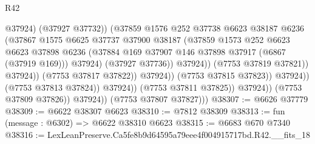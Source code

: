 \begin{lexlean}{R42}
\begin{coremodule}
{                                                  @37924)
                                                (@37927 @37732))
                                              (@37859
                                                @1576
                                                @252
                                                @37738
                                                @6623
                                                @38187
                                                @6236
                                                (@37867
                                                  @1575
                                                  @6625
                                                  @37737
                                                  @37900
                                                  @38187
                                                  (@37859
                                                    @1573
                                                    @252
                                                    @6623
                                                    @6623
                                                    @37898
                                                    @6236
                                                    (@37884
                                                      @169
                                                      @37907
                                                      @146
                                                      @37898
                                                      @37917
                                                      (@6867 (@37919 @169)))
                                                    @37924)
                                                  (@37927 @37736))
                                                @37924))
                                            (@7753 @37819 @37821))
                                          @37924))
                                      (@7753 @37817 @37822))
                                    @37924))
                                (@7753 @37815 @37823))
                              @37924))
                          (@7753 @37813 @37824))
                        @37924))
                    (@7753 @37811 @37825))
                  @37924))
              (@7753 @37809 @37826))
            @37924))
        (@7753 @37807 @37827)))
@38307 := @6626 @37779
@38309 := @6622 @38307 @6623
@38310 := @7812 @38309
@38313 := fun (message : @6302) => @6622 @38310 @6623
@38315 := @6683 @670 @7340
@38316 := LexLeanPreserve.Ca5fe8b9d64595a79eee4f004915717bd.R42.__fits_18
}
\end{coremodule}
\end{lexlean}
